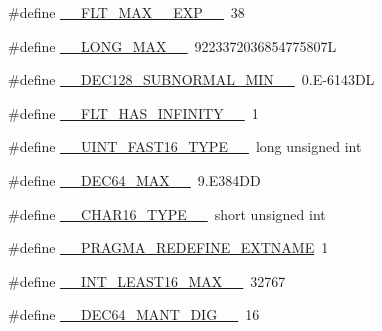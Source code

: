 \begin{DoxyCompactItemize}
\item 
\#define \hyperlink{build-analizer__host-_desktop___qt__5__9__0___g_c_c__64bit-debug_2moc__predefs_8h_a3641a65e329884d817848ba5d6163f07}{\+\_\+\+\_\+\+F\+L\+T\+\_\+\+M\+A\+X\+\_\+\_\+\+E\+X\+P\+\_\+\+\_\+}~38
\item 
\#define \hyperlink{build-analizer__host-_desktop___qt__5__9__0___g_c_c__64bit-debug_2moc__predefs_8h_af16678d7537c7a5463c807639fe2f635}{\+\_\+\+\_\+\+L\+O\+N\+G\+\_\+\+M\+A\+X\+\_\+\+\_\+}~9223372036854775807\+L
\item 
\#define \hyperlink{build-analizer__host-_desktop___qt__5__9__0___g_c_c__64bit-debug_2moc__predefs_8h_a63678ee519e34f99b61f3aeb5ff2cd75}{\+\_\+\+\_\+\+D\+E\+C128\+\_\+\+S\+U\+B\+N\+O\+R\+M\+A\+L\+\_\+\+M\+I\+N\+\_\+\+\_\+}~0.\+E-\/6143\+D\+L
\item 
\#define \hyperlink{build-analizer__host-_desktop___qt__5__9__0___g_c_c__64bit-debug_2moc__predefs_8h_a658d9ba84d429e748ce5f1905732c962}{\+\_\+\+\_\+\+F\+L\+T\+\_\+\+H\+A\+S\+\_\+\+I\+N\+F\+I\+N\+I\+T\+Y\+\_\+\+\_\+}~1
\item 
\#define \hyperlink{build-analizer__host-_desktop___qt__5__9__0___g_c_c__64bit-debug_2moc__predefs_8h_a5aed2c2843dad661012dac2d465f89e1}{\+\_\+\+\_\+\+U\+I\+N\+T\+\_\+\+F\+A\+S\+T16\+\_\+\+T\+Y\+P\+E\+\_\+\+\_\+}~long unsigned int
\item 
\#define \hyperlink{build-analizer__host-_desktop___qt__5__9__0___g_c_c__64bit-debug_2moc__predefs_8h_a06608084919123d90621d715daf1f456}{\+\_\+\+\_\+\+D\+E\+C64\+\_\+\+M\+A\+X\+\_\+\+\_\+}~9.\+E384\+D\+D
\item 
\#define \hyperlink{build-analizer__host-_desktop___qt__5__9__0___g_c_c__64bit-debug_2moc__predefs_8h_a95b91b7560e936fdc4ce441d38b94b3e}{\+\_\+\+\_\+\+C\+H\+A\+R16\+\_\+\+T\+Y\+P\+E\+\_\+\+\_\+}~short unsigned int
\item 
\#define \hyperlink{build-analizer__host-_desktop___qt__5__9__0___g_c_c__64bit-debug_2moc__predefs_8h_a165bf2f00e518485a1bb58c1918205b0}{\+\_\+\+\_\+\+P\+R\+A\+G\+M\+A\+\_\+\+R\+E\+D\+E\+F\+I\+N\+E\+\_\+\+E\+X\+T\+N\+A\+M\+E}~1
\item 
\#define \hyperlink{build-analizer__host-_desktop___qt__5__9__0___g_c_c__64bit-debug_2moc__predefs_8h_a4f3694eafdad4edb2bfe114a06553dec}{\+\_\+\+\_\+\+I\+N\+T\+\_\+\+L\+E\+A\+S\+T16\+\_\+\+M\+A\+X\+\_\+\+\_\+}~32767
\item 
\#define \hyperlink{build-analizer__host-_desktop___qt__5__9__0___g_c_c__64bit-debug_2moc__predefs_8h_a61c258ffad919b338b83e1401265f671}{\+\_\+\+\_\+\+D\+E\+C64\+\_\+\+M\+A\+N\+T\+\_\+\+D\+I\+G\+\_\+\+\_\+}~16

\end{DoxyCompactItemize}
